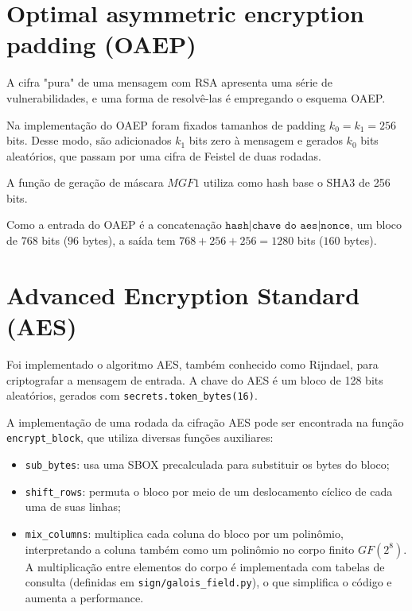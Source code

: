 \documentclass[a4paper, 10.5pt]{article}
\begin{document}

\section{Optimal asymmetric encryption padding (OAEP)} %
\label{sec:oaep}
    A cifra "pura" de uma mensagem com RSA apresenta uma série de
    vulnerabilidades, e uma forma de resolvê-las é empregando o esquema OAEP. 

    Na implementação do OAEP foram fixados tamanhos de padding $k_0 = k_1 = 256$ bits.
    Desse modo, são adicionados $k_1$ bits zero à mensagem e gerados $k_0$ bits
    aleatórios, que passam por uma cifra de Feistel de duas rodadas.  

    A função de geração de máscara $MGF1$\citep{mgf1} utiliza como hash base o
    SHA3 de 256 bits. 

    Como a entrada do OAEP é a concatenação $\texttt{hash} | \texttt{chave do
    aes} | \texttt{nonce}$, um bloco de $768$ bits ($96$ bytes), a saída
    tem $768 + 256 + 256 = 1280$ bits ($160$ bytes).



\section{Advanced Encryption Standard (AES)} %
\label{sec:aes}
Foi implementado o algoritmo AES, também conhecido como Rijndael, para
criptografar a mensagem de entrada. A chave do AES é um bloco de 128 bits
aleatórios, gerados com \verb|secrets.token_bytes(16)|.

A implementação de uma rodada da cifração AES pode ser encontrada na função
\verb|encrypt_block|, que utiliza diversas funções auxiliares:
\begin{itemize}
  \item \verb|sub_bytes|: usa uma SBOX precalculada para substituir os bytes do
      bloco;
  \item \verb|shift_rows|: permuta o bloco por meio de um deslocamento cíclico
      de cada uma de suas linhas;
  \item \verb|mix_columns|: multiplica cada coluna do bloco por um polinômio,
      interpretando a coluna também como um polinômio no corpo finito $GF(2^8)$.
      A multiplicação entre elementos do corpo é implementada com tabelas de
      consulta (definidas em \verb|sign/galois_field.py|), o que simplifica o código e aumenta a performance.
\end{itemize} 
\end{document}
